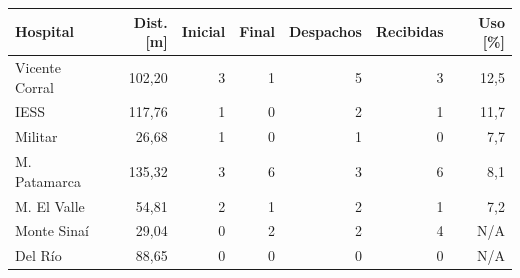 \begin{tabular}{lrrrrrr}
\toprule
Hospital & Dist. [m] & Inicial & Final & Despachos & Recibidas & Uso [\%] \\
\midrule
Vicente Corral & 102,20 & 3 & 1 & 5 & 3 & 12,5 \\
IESS & 117,76 & 1 & 0 & 2 & 1 & 11,7 \\
Militar & 26,68 & 1 & 0 & 1 & 0 & 7,7 \\
M. Patamarca & 135,32 & 3 & 6 & 3 & 6 & 8,1 \\
M. El Valle & 54,81 & 2 & 1 & 2 & 1 & 7,2 \\
Monte Sinaí & 29,04 & 0 & 2 & 2 & 4 & N/A \\
Del Río & 88,65 & 0 & 0 & 0 & 0 & N/A \\
\bottomrule
\end{tabular}
